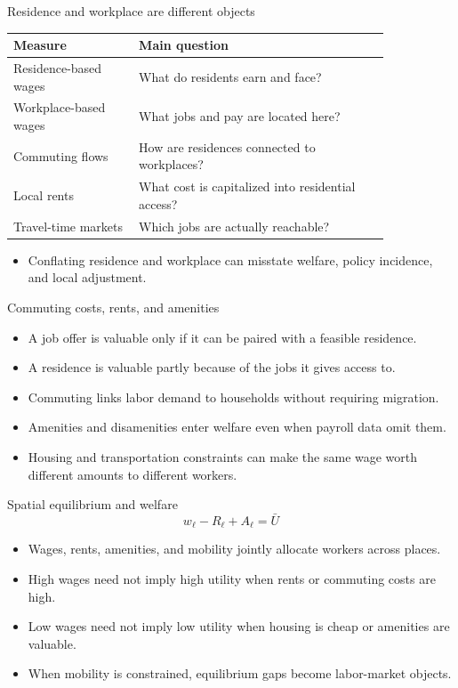 \documentclass[aspectratio=169,11pt]{beamer}
\begin{document}
\begin{frame}{Residence and workplace are different objects}
\small
\begin{tabular}{p{0.28\linewidth} p{0.56\linewidth}}
\toprule
Measure & Main question \\
\midrule
Residence-based wages & What do residents earn and face? \\
Workplace-based wages & What jobs and pay are located here? \\
Commuting flows & How are residences connected to workplaces? \\
Local rents & What cost is capitalized into residential access? \\
Travel-time markets & Which jobs are actually reachable? \\
\bottomrule
\end{tabular}
\vspace{0.35cm}
\begin{itemize}
    \item Conflating residence and workplace can misstate welfare, policy incidence, and local adjustment.
\end{itemize}
\end{frame}

\begin{frame}{Commuting costs, rents, and amenities}
\begin{itemize}
    \item A job offer is valuable only if it can be paired with a feasible residence.
    \item A residence is valuable partly because of the jobs it gives access to.
    \item Commuting links labor demand to households without requiring migration.
    \item Amenities and disamenities enter welfare even when payroll data omit them.
    \item Housing and transportation constraints can make the same wage worth different amounts to different workers.
\end{itemize}
\end{frame}

\begin{frame}{Spatial equilibrium and welfare}
\[
w_\ell - R_\ell + A_\ell = \bar{U}
\]
\begin{itemize}
    \item Wages, rents, amenities, and mobility jointly allocate workers across places.
    \item High wages need not imply high utility when rents or commuting costs are high.
    \item Low wages need not imply low utility when housing is cheap or amenities are valuable.
    \item When mobility is constrained, equilibrium gaps become labor-market objects.
\end{itemize}
\end{frame}
\end{document}
